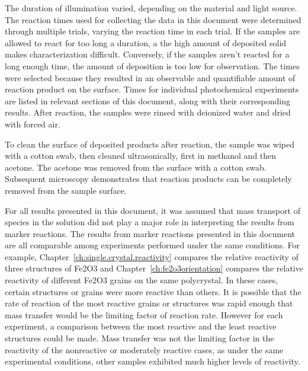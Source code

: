 \documentclass[12pt,%
              twoside,
               letterpaper]{uiothesis}
\begin{document}
The duration of illumination varied, depending on the material and light source. The
reaction times used for collecting the data in this document were determined through
multiple trials, varying the reaction time in each trial. If the samples are allowed to
react for too long a duration, a the high amount of deposited solid makes characterization
difficult. Conversely, if the samples aren't reacted for a long enough time, the amount of
deposition is too low for observation. The times were selected because they resulted in an
observable and quantifiable amount of reaction product on the surface. Times for
individual photochemical experiments are listed in relevant sections of this document,
along with their corresponding results. After reaction, the samples were rinsed with
deionized water and dried with forced air.

To clean the surface of deposited products after reaction, the sample was wiped with a
cotton swab, then cleaned ultrasonically, first in methanol and then acetone. The acetone
was removed from the surface with a cotton swab. Subsequent microscopy demonstrates that
reaction products can be completely removed from the sample surface.

\label{masstransfer}
For all results presented in this document, it was assumed that mass transport of species
in the solution did not play a major role in interpreting the results from marker
reactions. The results from marker reactions presented in this document are all comparable
among experiments performed under the same conditions. For example,
Chapter~\ref{ch:single.crystal.reactivity} compares the relative reactivity of three
structures of Fe2O3 and Chapter~\ref{ch:fe2o3orientation} compares the relative
reactivity of different Fe2O3 grains on the same polycrystal. In these cases, certain
structures or grains were more reactive than others. It is possible that the rate of
reaction of the most reactive grains or structures was rapid enough that mass transfer
would be the limiting factor of reaction rate. However for each experiment, a comparison
between the most reactive and the least reactive structures could be made. Mass transfer
was not the limiting factor in the reactivity of the nonreactive or moderately reactive
cases, as under the same experimental conditions, other samples exhibited much higher
levels of reactivity.
\end{document}
